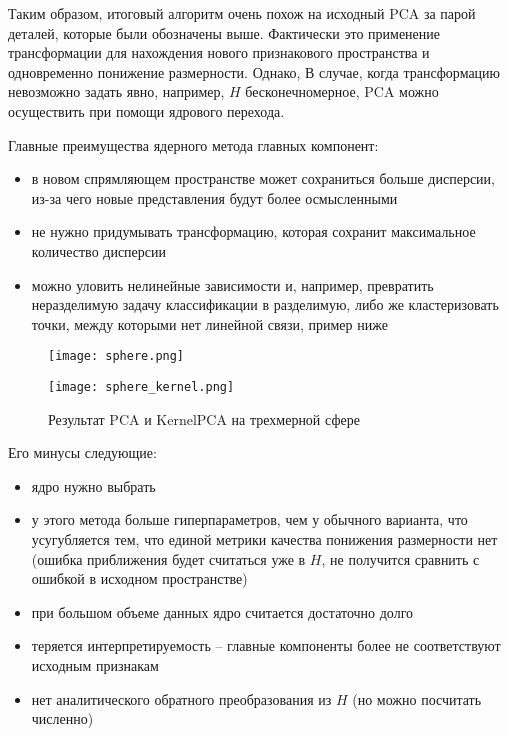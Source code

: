\documentclass[12pt,fleqn]{article}
\begin{document}
Таким образом, итоговый алгоритм очень похож на исходный PCA за парой деталей, которые были обозначены выше. Фактически это применение трансформации для нахождения нового признакового пространства и одновременно понижение размерности. Однако, В случае, когда трансформацию невозможно задать явно, например, $H$ бесконечномерное, PCA можно осуществить при помощи ядрового перехода.

\vspace{2mm}

Главные преимущества ядерного метода главных компонент:
\begin{itemize}
    \item в новом спрямляющем пространстве может сохраниться больше дисперсии, из-за чего новые представления будут более осмысленными
    \item не нужно придумывать трансформацию, которая сохранит максимальное количество дисперсии
    \item можно уловить нелинейные зависимости и, например, превратить неразделимую задачу классификации в разделимую, либо же кластеризовать точки, между которыми нет линейной связи, пример ниже
\end{itemize}

\begin{figure}[h|t]
\centering
\begin{minipage}{0.36\textwidth}
  \centering
  \texttt{[image: sphere.png]}
  \label{fig:sub1}
\end{minipage}%
\begin{minipage}{0.36\textwidth}
  \centering
  \texttt{[image: sphere\_kernel.png]}
  \label{fig:sub2}
\end{minipage}
\caption{Результат PCA и KernelPCA на трехмерной сфере}
\label{fig:test}
\end{figure}

\break

Его минусы следующие:
\begin{itemize}
    \item ядро нужно выбрать
    \item у этого метода больше гиперпараметров, чем у обычного варианта, что усугубляется тем, что единой метрики качества понижения размерности нет (ошибка приближения будет считаться уже в $H$, не получится сравнить с ошибкой в исходном пространстве)
    \item при большом объеме данных ядро считается достаточно долго
    \item теряется интерпретируемость -- главные компоненты более не соответствуют исходным признакам
    \item нет аналитического обратного преобразования из $H$ (но можно посчитать численно)
\end{itemize}
\end{document}

